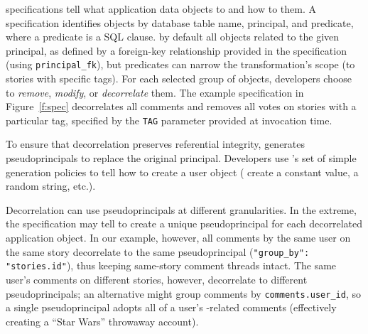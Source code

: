 \noindent
\Xx specifications tell \sys what application data objects to \xx and how to \xx them.
%
A \xx specification identifies objects by database table name, principal, and
predicate, where a predicate is a SQL  clause.
%
\sys by default \xxs all objects related to the given principal, as defined by
a foreign-key relationship provided in the \xx specification (using
\texttt{principal\_fk}), but predicates can narrow the transformation's scope
(\eg to stories with specific tags).
%
For each selected group of objects, developers choose to
\emph{remove}, \emph{modify}, or \emph{decorrelate} them.
%
The example specification in Figure~\ref{f:spec} decorrelates all comments and removes all
votes on stories with a particular tag, specified by the \texttt{TAG} parameter provided
at invocation time.

%
%

To ensure that decorrelation preserves referential integrity, \sys generates
pseudoprincipals to replace the original principal.  Developers use \sys's set
of simple generation policies to tell \sys how to create a user object (\eg
create a constant value, a random string, etc.). 
%

Decorrelation can use pseudoprincipals at different granularities.
In the extreme, the \xx specification may tell \sys to create a unique
pseudoprincipal for each decorrelated application object.
In our example, however, all comments by the same user on the same story
decorrelate to the same pseudoprincipal (\verb+"group_by": "stories.id"+), thus
keeping same-story comment threads intact.
%
The same user's comments on different stories, however, decorrelate to different
pseudoprincipals; an alternative might group comments by
\texttt{comments.user\_id}, so a single pseudoprincipal adopts all of a user's
-related comments (effectively creating a ``Star Wars'' throwaway account).

